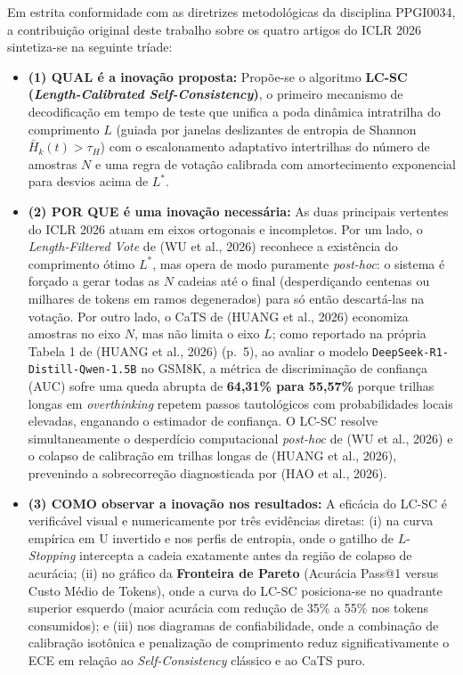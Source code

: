 \documentclass[9pt,conference]{IEEEtran}
\begin{document}
Em estrita conformidade com as diretrizes metodol\'{o}gicas da disciplina PPGI0034, a contribui\c{c}\~{a}o original deste trabalho sobre os quatro artigos do ICLR 2026 sintetiza-se na seguinte tr\'{i}ade:
\begin{itemize}
    \item \textbf{(1) QUAL \'{e} a inova\c{c}\~{a}o proposta:} Prop\~{o}e-se o algoritmo \textbf{LC-SC (\textit{Length-Calibrated Self-Consistency})}, o primeiro mecanismo de decodifica\c{c}\~{a}o em tempo de teste que unifica a poda din\^{a}mica intratrilha do comprimento $L$ (guiada por janelas deslizantes de entropia de Shannon $\bar{H}_k(t) > \tau_H$) com o escalonamento adaptativo intertrilhas do n\'{u}mero de amostras $N$ e uma regra de vota\c{c}\~{a}o calibrada com amortecimento exponencial para desvios acima de $L^*$.
    \item \textbf{(2) POR QUE \'{e} uma inova\c{c}\~{a}o necess\'{a}ria:} As duas principais vertentes do ICLR 2026 atuam em eixos ortogonais e incompletos. Por um lado, o \textit{Length-Filtered Vote} de (WU et al., 2026) reconhece a exist\^{e}ncia do comprimento \'{o}timo $L^*$, mas opera de modo puramente \textit{post-hoc}: o sistema \'{e} for\c{c}ado a gerar todas as $N$ cadeias at\'{e} o final (desperdi\c{c}ando centenas ou milhares de tokens em ramos degenerados) para s\'{o} ent\~{a}o descart\'{a}-las na vota\c{c}\~{a}o. Por outro lado, o CaTS de (HUANG et al., 2026) economiza amostras no eixo $N$, mas n\~{a}o limita o eixo $L$; como reportado na pr\'{o}pria Tabela 1 de (HUANG et al., 2026) (p.~5), ao avaliar o modelo \texttt{DeepSeek-R1-Distill-Qwen-1.5B} no GSM8K, a m\'{e}trica de discrimina\c{c}\~{a}o de confian\c{c}a (AUC) sofre uma queda abrupta de \textbf{64,31\% para 55,57\%} porque trilhas longas em \textit{overthinking} repetem passos tautol\'{o}gicos com probabilidades locais elevadas, enganando o estimador de confian\c{c}a. O LC-SC resolve simultaneamente o desperd\'{i}cio computacional \textit{post-hoc} de (WU et al., 2026) e o colapso de calibra\c{c}\~{a}o em trilhas longas de (HUANG et al., 2026), prevenindo a sobrecorre\c{c}\~{a}o diagnosticada por (HAO et al., 2026).
    \item \textbf{(3) COMO observar a inova\c{c}\~{a}o nos resultados:} A efic\'{a}cia do LC-SC \'{e} verific\'{a}vel visual e numericamente por tr\^{e}s evid\^{e}ncias diretas: (i) na curva emp\'{i}rica em U invertido e nos perfis de entropia, onde o gatilho de $L$-\textit{Stopping} intercepta a cadeia exatamente antes da regi\~{a}o de colapso de acur\'{a}cia; (ii) no gr\'{a}fico da \textbf{Fronteira de Pareto} (Acur\'{a}cia Pass@1 versus Custo M\'{e}dio de Tokens), onde a curva do LC-SC posiciona-se no quadrante superior esquerdo (maior acur\'{a}cia com redu\c{c}\~{a}o de 35\% a 55\% nos tokens consumidos); e (iii) nos diagramas de confiabilidade, onde a combina\c{c}\~{a}o de calibra\c{c}\~{a}o isot\^{o}nica e penaliza\c{c}\~{a}o de comprimento reduz significativamente o ECE em rela\c{c}\~{a}o ao \textit{Self-Consistency} cl\'{a}ssico e ao CaTS puro.
\end{itemize}
\end{document}
